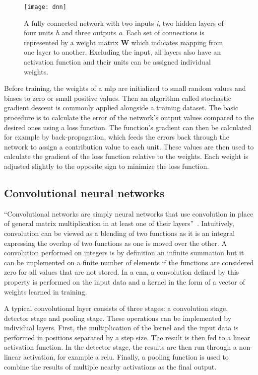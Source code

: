 \begin{figure}[H]
\centering
\texttt{[image: dnn]}
\caption{A fully connected network with two inputs \textit{i}, two hidden layers of
         four units \textit{h} and three outputs \textit{o}. Each set of connections
         is represented by a weight matrix \textbf{W} which indicates mapping from one
         layer to another. Excluding the input, all layers also have an activation
         function and their units can be assigned individual weights.}\label{fig:fcon}
\end{figure}

Before training, the weights of a \ac{mlp} are initialized to small random values and
biases to zero or small positive values. Then an algorithm called stochastic gradient
descent is commonly applied alongside a training dataset. The basic procedure is to
calculate the error of the network's output values compared to the desired ones using
a loss function. The function's gradient can then be calculated for example by back-propagation,
which feeds the errors back through the network to assign a contribution value to each unit.
These values are then used to calculate the gradient of the loss function relative to the
weights. Each weight is adjusted slightly to the opposite sign to minimize the loss function.

\subsection{Convolutional neural networks}\label{ssec:dlcnn}

``Convolutional networks are simply neural networks that use convolution in place of
general matrix multiplication in at least one of their layers''~\cite{DEEP_LEARNING}.
Intuitively, convolution can be viewed as a blending of two functions as it is an
integral expressing the overlap of two functions as one is moved over the other.
A convolution performed on integers is by definition an infinite summation but it
can be implemented on a finite number of elements if the functions are considered
zero for all values that are not stored. In a \ac{cnn}, a convolution defined by this
property is performed on the input data and a kernel in the form of a vector of weights
learned in training.

A typical convolutional layer consists of three stages: a convolution stage, detector
stage and pooling stage. These operations can be implemented by individual layers. First,
the multiplication of the kernel and the input data is performed in positions separated by
a step size. The result is then fed to a linear activation function. In the detector stage,
the results are then run through a non-linear activation, for example a \ac{relu}. Finally,
a pooling function is used to combine the results of multiple nearby activations as the
final output.

